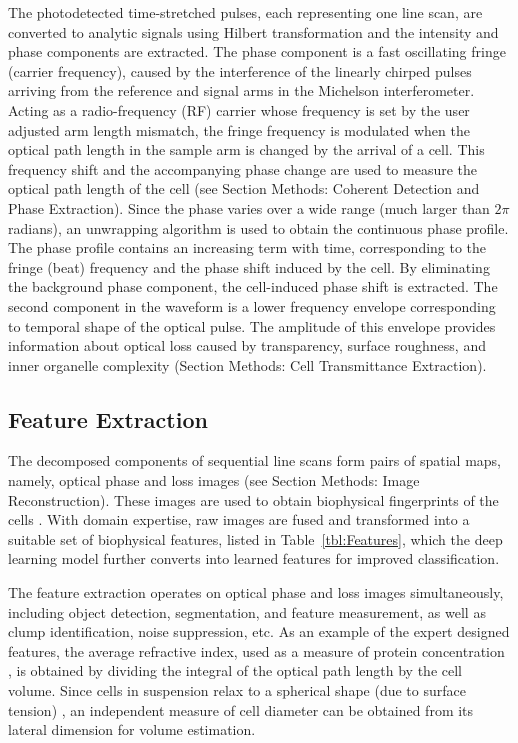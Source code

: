 \documentclass[aps,pra,reprint,superscriptaddress]{revtex4-1}
\begin{document}
The photodetected time-stretched pulses, each representing one line scan, are converted to analytic signals using Hilbert transformation \cite{king2009hilbert} and the intensity and phase components are extracted. The phase component is a fast oscillating fringe (carrier frequency), caused by the interference of the linearly chirped pulses arriving from the reference and signal arms in the Michelson interferometer. Acting as a radio-frequency (RF) carrier whose frequency is set by the user adjusted arm length mismatch, the fringe frequency is modulated when the optical path length in the sample arm is changed by the arrival of a cell. This frequency shift and the accompanying phase change are used to measure the optical path length of the cell (see Section Methods: Coherent Detection and Phase Extraction). Since the phase varies over a wide range (much larger than $2 \pi$ radians), an unwrapping algorithm is used to obtain the continuous phase profile. The phase profile contains an increasing term with time, corresponding to the fringe (beat) frequency and the phase shift induced by the cell. By eliminating the background phase component, the cell-induced phase shift is extracted. The second component in the waveform is a lower frequency envelope corresponding to temporal shape of the optical pulse. The amplitude of this envelope provides information about optical loss caused by transparency, surface roughness, and inner organelle complexity (Section Methods: Cell Transmittance Extraction). 

\subsection*{Feature Extraction}

The decomposed components of sequential line scans form pairs of spatial maps, namely, optical phase and loss images (see Section Methods: Image Reconstruction). These images are used to obtain biophysical fingerprints of the cells \cite{mahjoubfar2013optically, driscoll2012automated}. With domain expertise, raw images are fused and transformed into a suitable set of biophysical features, listed in Table~\ref{tbl:Features}, which the deep learning model further converts into learned features for improved classification. 

The feature extraction operates on optical phase and loss images simultaneously, including object detection, segmentation, and feature measurement, as well as clump identification, noise suppression, etc. As an example of the expert designed features, the average refractive index, used as a measure of protein concentration \cite{barer1953refractometry}, is obtained by dividing the integral of the optical path length by the cell volume. Since cells in suspension relax to a spherical shape (due to surface tension) \cite{revel1974adhesion,whur1977substrate}, an independent measure of cell diameter can be obtained from its lateral dimension for volume estimation. 
\end{document}
